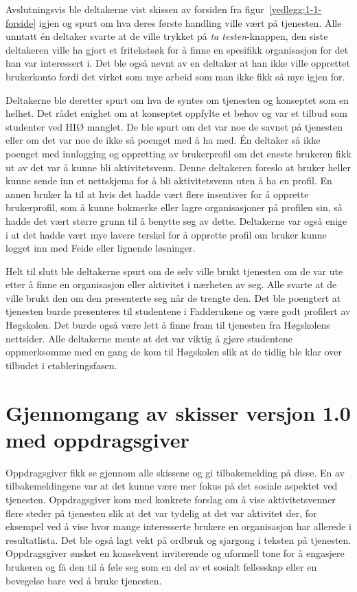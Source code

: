 Avslutningsvis ble deltakerne vist skissen av forsiden fra figur~\ref{vedlegg:1-1-forside} igjen og spurt om hva deres første handling ville vært på tjenesten. Alle unntatt én deltaker svarte at de ville trykket på {\em ta testen}-knappen, den siste deltakeren ville ha gjort et fritekstsøk for å finne en spesifikk organisasjon for det han var interessert i. Det ble også nevnt av en deltaker at han ikke ville opprettet brukerkonto fordi det virket som mye arbeid som man ikke fikk så mye igjen for.

Deltakerne ble deretter spurt om hva de syntes om tjenesten og konseptet som en helhet. Det rådet enighet om at konseptet oppfylte et behov og var et tilbud som studenter ved HIØ manglet. De ble spurt om det var noe de savnet på tjenesten eller om det var noe de ikke så poenget med å ha med. Én deltaker så ikke poenget med innlogging og oppretting av brukerprofil om det eneste brukeren fikk ut av det var å kunne bli aktivitetsvenn. Denne deltakeren foreslo at bruker heller kunne sende inn et nettskjema for å bli aktivitetsvenn uten å ha en profil. En annen bruker la til at hvis det hadde vært flere insentiver for å opprette brukerprofil, som å kunne bokmerke eller lagre organisasjoner på profilen sin, så hadde det vært større grunn til å benytte seg av dette. Deltakerne var også enige i at det hadde vært mye lavere terskel for å opprette profil om bruker kunne logget inn med Feide eller lignende løsninger.

Helt til slutt ble deltakerne spurt om de selv ville brukt tjenesten om de var ute etter å finne en organisasjon eller aktivitet i nærheten av seg. Alle svarte at de ville brukt den om den presenterte seg når de trengte den. Det ble poengtert at tjenesten burde presenteres til studentene i Fadderukene og være godt profilert av Høgskolen. Det burde også være lett å finne fram til tjenesten fra Høgskolens nettsider. Alle deltakerne mente at det var viktig å gjøre studentene oppmerksomme med en gang de kom til Høgskolen slik at de tidlig ble klar over tilbudet i etableringsfasen.

\section{Gjennomgang av skisser versjon 1.0 med oppdragsgiver}
\label{section:skisser1.0-oppdragsgiver}

Oppdragsgiver fikk se gjennom alle skissene og gi tilbakemelding på disse. En av tilbakemeldingene var at det kunne være mer fokus på det sosiale aspektet ved tjenesten. Oppdragsgiver kom med konkrete forslag om å vise aktivitetsvenner flere steder på tjenesten slik at det var tydelig at det var aktivitet der, for eksempel ved å vise hvor mange interesserte brukere en organisasjon har allerede i resultatlista. Det ble også lagt vekt på ordbruk og sjargong i teksten på tjenesten. Oppdragsgiver ønsket en konsekvent inviterende og uformell tone for å engasjere brukeren og få den til å føle seg som en del av et sosialt fellesskap eller en bevegelse bare ved å bruke tjenesten.


